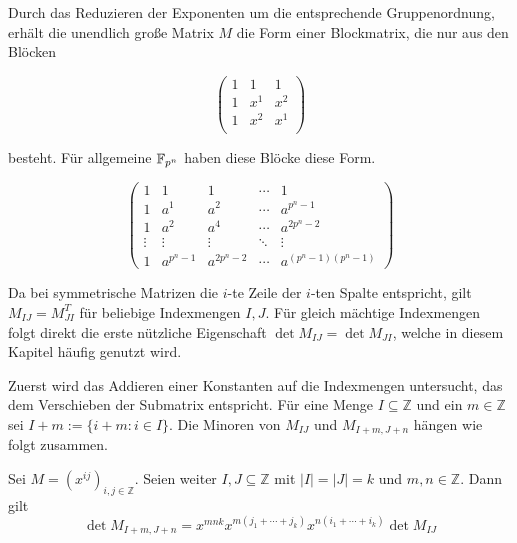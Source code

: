 Durch das Reduzieren der Exponenten um die entsprechende Gruppenordnung, erhält die unendlich große Matrix $M$ die Form einer Blockmatrix, die nur aus den Blöcken

\begin{equation*}
    \begin{pmatrix}
        1     & 1     & 1     \\
        1     & x^{1} & x^{2} \\
        1     & x^{2} & x^{1} \\
    \end{pmatrix}
\end{equation*}

besteht. Für allgemeine $\field{p}[n]$ haben diese Blöcke diese Form.

\begin{equation*}
    \begin{pmatrix}
        1     & 1       & 1         &\cdots & 1 \\
        1     & a^1     & a^2       &\cdots & a^{p^n-1} \\
        1     & a^2     & a^4       &\cdots & a^{2p^n-2} \\
        \vdots&\vdots   &\vdots     &\ddots &\vdots \\
        1     &a^{p^n-1}&a^{2p^n-2} &\cdots &a^{(p^n-1)(p^n-1)}
    \end{pmatrix}
\end{equation*}

Da bei symmetrische Matrizen die $i$-te Zeile der $i$-ten Spalte entspricht, gilt $M_{IJ} = M_{JI}^T$ für beliebige Indexmengen $I,J$. Für gleich mächtige Indexmengen folgt direkt die erste nützliche Eigenschaft $\det M_{IJ} = \det M_{JI}$, welche in diesem Kapitel häufig genutzt wird.

Zuerst wird das Addieren einer Konstanten auf die Indexmengen untersucht, das dem Verschieben der Submatrix entspricht. Für eine Menge $I \subseteq \mathbb{Z}$ und ein $m \in \mathbb{Z}$ sei $I+m := \{i+m:i\in I\}$. Die Minoren von $M_{IJ}$ und $M_{I+m,J+n}$ hängen wie folgt zusammen.

\begin{satz} \label{satz:translation}
    Sei $M = \left( x^{ij} \right)_{i,j \in \mathbb{Z}}$. Seien weiter $I,J \subseteq \mathbb{Z}$ mit $|I|=|J|=k$ und $m,n \in \mathbb{Z}$. Dann gilt
    \begin{equation*}
        \det{} M_{I+m,J+n} = x^{mnk} x^{m(j_1 +\cdots + j_k)} x^{n(i_1+\cdots +i_k)} \det{} M_{IJ}
    \end{equation*}
\end{satz}


